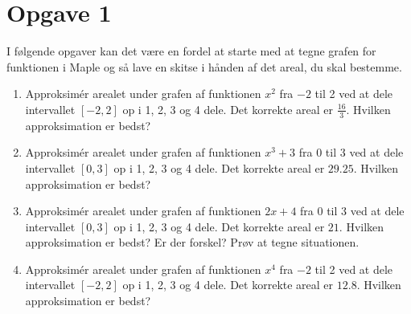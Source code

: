 \section*{Opgave 1}
I følgende opgaver kan det være en fordel at starte med at tegne grafen for funktionen i Maple og så lave en skitse i hånden af det areal, du skal bestemme. 
\begin{enumerate}[label=\roman*)]
\item Approksimér arealet under grafen af funktionen $x^2$ fra $-2$ til 2 ved at dele intervallet $[-2,2]$ op i 1, 2, 3 og 4 dele. Det korrekte areal er $\frac{16}{3}$. Hvilken approksimation er bedst?
\item Approksimér arealet under grafen af funktionen $x^3+3$ fra $0$ til 3 ved at dele intervallet $[0,3]$ op i 1, 2, 3 og 4 dele. Det korrekte areal er $29.25$. Hvilken approksimation er bedst?
\item Approksimér arealet under grafen af funktionen $2x+4$ fra $0$ til 3 ved at dele intervallet $[0,3]$ op i 1, 2, 3 og 4 dele. Det korrekte areal er $21$. Hvilken approksimation er bedst? Er der forskel? Prøv at tegne situationen.
\item Approksimér arealet under grafen af funktionen $x^4$ fra $-2$ til 2 ved at dele intervallet $[-2,2]$ op i 1, 2, 3 og 4 dele. Det korrekte areal er $12.8$. Hvilken approksimation er bedst?
\end{enumerate}